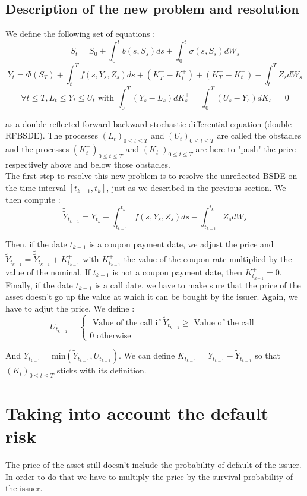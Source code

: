 \documentclass[a4paper,11pt,english]{book}
\begin{document}
\subsection{Description of the new problem and resolution}
We define the following set of equations :
$$S_{t}=S_{0} + \int_{0}^{t}b(s,S_{s})ds + \int_{0}^{t}\sigma(s,S_{s})dW_{s}$$
$$Y_{t}=\Phi(S_{T})+\int_{t}^{T}f(s,Y_{s},Z_{s})ds+(K_{T}^{+}-K_{t}^{+})+(K_{T}^{-}-K_{t}^{-})-\int_{t}^{T}Z_{s}dW_{s}$$
$$\forall t\leq T, L_{t}\leq Y_{t}\leq U_{t} \text{ with } \int_{0}^{T}(Y_{s}-L_{s})dK_{s}^{+}=\int_{0}^{T}(U_{s}-Y_{s})dK_{s}^{+}=0$$

as a double reflected forward backward stochastic differential equation (double RFBSDE).
The processes $(L_{t})_{0\leq t \leq T}$ and $(U_{t})_{0\leq t \leq T}$ are called the obstacles and the processes $(K_{t}^{+})_{0\leq t \leq T}$ and $(K_{t}^{-})_{0\leq t \leq T}$ are here to "push" the price respectively above and below those obstacles. \\

The first step to resolve this new problem is to resolve the unreflected BSDE on the time interval $[t_{k-1},t_{k}]$, just as we described in the previous section. We then compute : $$\widetilde{\widetilde{Y}}_{t_{k-1}}=Y_{t_{k}}+\int_{t_{k-1}}^{t_{k}}f(s,Y_{s},Z_{s})ds-\int_{t_{k-1}}^{t_{k}}Z_{s}dW_{s}$$

Then, if the date $t_{k-1}$ is a coupon payment date, we adjust the price and $\widetilde{Y}_{t_{k-1}}= \widetilde{\widetilde{Y}}_{t_{k-1}} + K_{t_{k-1}}^{+}$ with $K_{t_{k-1}}^{+}$ the value of the coupon rate multiplied by the value of the nominal. If $t_{k-1}$ is not a coupon payment date, then $K_{t_{k-1}}^{+}=0$. \\
Finally, if the date $t_{k-1}$ is a call date, we have to make sure that the price of the asset doesn't go up the value at which it can be bought by the issuer. Again, we have to adjut the price. We define :
$$U_{t_{k-1}}=\left\{
    \begin{array}{ll}
        \text{ Value of the call if } \widetilde{Y}_{t_{k-1}}\geq \text{ Value of the call }\\
        0 \text{ otherwise }
    \end{array}
\right.$$

And $Y_{t_{k-1}}=\text{min}(\widetilde{Y}_{t_{k-1}},U_{t_{k-1}})$. We can define $K_{t_{k-1}}=Y_{t_{k-1}}-\widetilde{Y}_{t_{k-1}}$ so that $(K_{t})_{0\leq t\leq T}$ sticks with its definition.
\section{Taking into account the default risk}
The price of the asset still doesn't include the probability of default of the issuer. In order to do that we have to multiply the price by the survival probability of the issuer.\\
\end{document}
